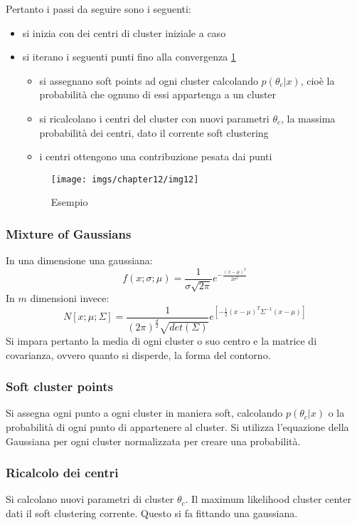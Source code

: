 	Pertanto i passi da seguire sono i seguenti:
	\begin{itemize}
		\item si inizia con dei centri di cluster iniziale a caso
		\item si iterano i seguenti punti fino alla convergenza \ref{fig:chapter12-12}
		\begin{itemize}
			\item si assegnano soft points ad ogni cluster calcolando $p(\theta_c|x)$, cio\`e la probabilit\`a che ognuno di essi appartenga a un cluster
			\item si ricalcolano i centri del cluster con nuovi parametri $\theta_c$, la massima probabilit\`a dei centri, dato il corrente soft clustering
			\item i centri ottengono una contribuzione pesata dai punti
		\end{itemize}

		\begin{figure}
			\centering
			\texttt{[image: imgs/chapter12/img12]}
			\caption{Esempio}
			\label{fig:chapter12-12}
		\end{figure}
	\end{itemize}

		\subsubsection{Mixture of Gaussians}
		In una dimensione una gaussiana:
		$$f(x;\sigma;\mu) = \frac{1}{\sigma\sqrt{2\pi}}e^{-\frac{(x-\mu)^2}{2\sigma^2}}$$
		In $m$ dimensioni invece:
		$$N[x;\mu;\Sigma] = \frac{1}{(2\pi)^{\frac{d}{2}}\sqrt{det(\Sigma)}}e^{[-\frac{1}{2}(x-\mu)^T\Sigma^{-1}(x-\mu)]}$$
		Si impara pertanto la media di ogni cluster o suo centro e la matrice di covarianza, ovvero quanto si disperde, la forma del contorno.
		
		\subsubsection{Soft cluster points}
		Si assegna ogni punto a ogni cluster in maniera soft, calcolando $p(\theta_c|x)$ o la probabilit\`a di ogni punto di appartenere al cluster.
		Si utilizza l'equazione della Gaussiana per ogni cluster normalizzata per creare una probabilit\`a.
		
		\subsubsection{Ricalcolo dei centri}
		Si calcolano nuovi parametri di cluster $\theta_c$.
		Il maximum likelihood cluster center dati il soft clustering corrente.
		Questo si fa fittando una gaussiana.
		
